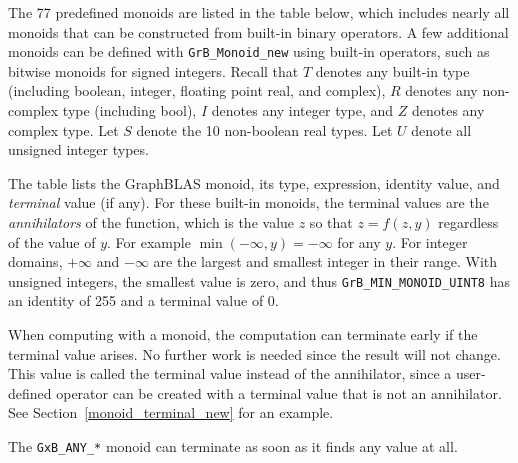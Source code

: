 \documentclass[12pt]{article}
\begin{document}
{The 77 predefined monoids are listed in the table below, which
includes nearly all monoids that can be constructed from built-in binary
operators.  A few additional monoids can be defined with \verb'GrB_Monoid_new'
using built-in operators, such as bitwise monoids for signed integers.
Recall that $T$ denotes any built-in type (including boolean, integer, floating
point real, and complex), $R$ denotes any non-complex type (including bool),
$I$ denotes any integer type, and $Z$ denotes any complex type.  Let $S$ denote
the 10 non-boolean real types.  Let $U$ denote all unsigned integer types.

The table lists the GraphBLAS monoid, its type, expression, identity
value, and {\em terminal} value (if any).  For these built-in monoids, the
terminal values are the {\em annihilators} of the function, which is the value
$z$ so that $z=f(z,y)$ regardless of the value of $y$.  For example
$\min(-\infty,y) = -\infty$ for any $y$.  For integer domains, $+\infty$ and
$-\infty$ are the largest and smallest integer in their range.  With unsigned
integers, the smallest value is zero, and thus \verb'GrB_MIN_MONOID_UINT8' has an
identity of 255 and a terminal value of 0.

When computing with a monoid, the computation can terminate early if the
terminal value arises.  No further work is needed since the result will not
change.  This value is called the terminal value instead of the annihilator,
since a user-defined operator can be created with a terminal value that is not
an annihilator.  See Section~\ref{monoid_terminal_new} for an example.

The \verb'GxB_ANY_*' monoid can terminate as soon as it finds any value at all.

}
\end{document}
